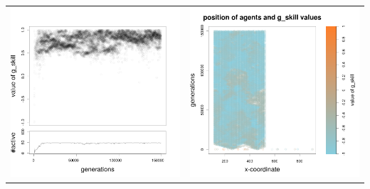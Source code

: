 \documentclass[a4paper,10pt]{article}
\begin{document}
\begin{table}[ht]
\begin{tabular}{cc}
 \newline
 \includegraphics[width=\imgSize]{images/5StaticEnv/Gplot92_staticEnv2}&\includegraphics[width=\imgSize]{images/5StaticEnv/Gplot92Static_staticEnv2}\\
 \end{tabular}

\end{table}
\end{document}
